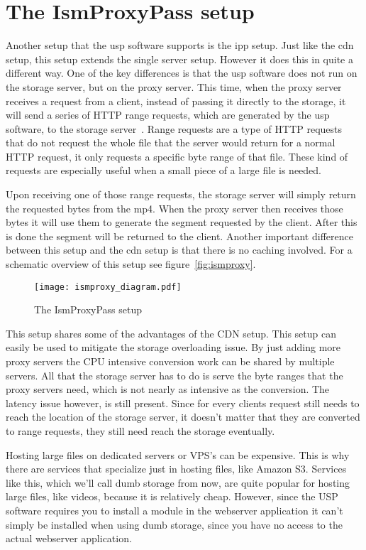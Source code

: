 \documentclass[twoside,openright]{uva-bachelor-thesis}
\begin{document}
\section{The IsmProxyPass setup}
Another setup that the \gls{usp} software supports is the \gls{ipp} setup. Just
like the \gls{cdn} setup, this setup extends the single server setup. However it
does this in quite a different way. One of the key differences is that the
\gls{usp} software does not run on the storage server, but on the proxy server.
This time, when the proxy server receives a request from a client, instead of
passing it directly to the storage, it will send a series of HTTP range
requests, which are generated by the \gls{usp} software, to the storage
server~\autocite{rangerequests}. Range requests are a type of
HTTP requests that do not request the whole file that the server would return
for a normal HTTP request, it only requests a specific byte range of that file.
These kind of requests are especially useful when a small piece of a large file
is needed.

Upon receiving one of those range requests, the storage server will simply
return the requested bytes from the mp4. When the proxy server then receives
those bytes it will use them to generate the segment requested by the client.
After this is done the segment will be returned to the client. Another important
difference between this setup and the \gls{cdn} setup is that there is no
caching involved.  For a schematic overview of this setup see
figure~\vref{fig:ismproxy}.

\begin{figure}
    \texttt{[image: ismproxy\_diagram.pdf]}
    \caption{The IsmProxyPass setup}\label{fig:ismproxy}
\end{figure}

This setup shares some of the advantages of the CDN setup. This setup can easily
be used to mitigate the storage overloading issue. By just adding more proxy
servers the CPU intensive conversion work can be shared by multiple servers. All
that the storage server has to do is serve the byte ranges that the proxy
servers need, which is not nearly as intensive as the conversion. The latency
issue however, is still present. Since for every clients request still needs to
reach the location of the storage server, it doesn't matter that they are
converted to range requests, they still need reach the storage eventually.

Hosting large files on dedicated servers or VPS’s can be expensive. This is why
there are services that specialize just in hosting files, like Amazon S3.
Services like this, which we’ll call dumb storage from now, are quite popular
for hosting large files, like videos, because it is relatively cheap. However,
since the USP software requires you to install a module in the webserver
application it can’t simply be installed when using dumb storage, since you have
no access to the actual webserver application.
\end{document}
